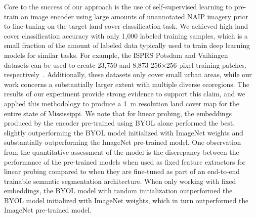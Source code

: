 Core to the success of our approach is the use of self-supervised learning to pre-train an image encoder using large amounts of unannotated NAIP imagery prior to fine-tuning on the target land cover classification task.
We achieved high land cover classification accuracy with only 1,000 labeled training samples, which is a small fraction of the amount of labeled data typically used to train deep learning models for similar tasks.
For example, the ISPRS Potsdam and Vaihingen datasets can be used to create 23,750 and 8,873 256\(\times\)256 pixel training patches, respectively~\citep{2DSemanticLabeling, 2DSemanticLabel}.
Additionally, these datasets only cover small urban areas, while our work concerns a substantially larger extent with multiple diverse ecoregions.
The results of our experiment provide strong evidence to support this claim, and we applied this methodology to produce a \SI{1}{\meter} resolution land cover map for the entire state of Mississippi.
We note that for linear probing, the embeddings produced by the encoder pre-trained using BYOL alone performed the best, slightly outperforming the BYOL model initialized with ImageNet weights and substantially outperforming the ImageNet pre-trained model.
One observation from the quantitative assessment of the model is the discrepancy between the performance of the pre-trained models when used as fixed feature extractors for linear probing compared to when they are fine-tuned as part of an end-to-end trainable semantic segmentation architecture.
When only working with fixed embeddings, the BYOL model with random initialization outperformed the BYOL model initialized with ImageNet weights, which in turn outperformed the ImageNet pre-trained model.
